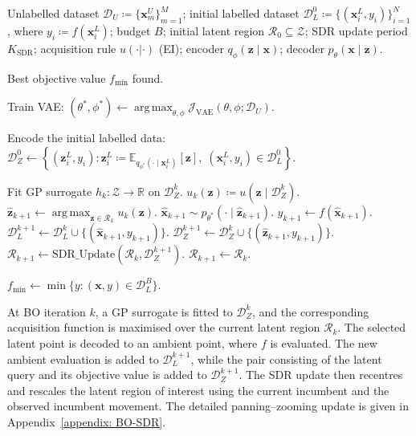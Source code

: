 \documentclass[pdflatex,sn-mathphys-num]{sn-jnl}%
\theoremstyle{thmstyleone}%
\theoremstyle{thmstyletwo}%
\theoremstyle{thmstylethree}%
\begin{document}
\begin{algorithm}[h]
\caption{BO--VAE with SDR and a Fixed Pretrained VAE}
\label{BOVAE-SDR}
\begin{algorithmic}[1]
\small
\Require Unlabelled dataset $\mathcal D_U \coloneq \{\mathbf{x}_m^U\}_{m=1}^M$; initial labelled dataset $\mathcal D_L^0 \coloneq \{(\mathbf{x}_i^L,y_i)\}_{i=1}^N$, where $y_i \coloneq f(\mathbf{x}_i^L)$; budget $B$; initial latent region $\mathcal R_0\subseteq\mathcal Z$; SDR update period $K_{\mathrm{SDR}}$; acquisition rule $u(\cdot|\cdot)$ \textrm{(EI)}; encoder $q_\phi(\mathbf z\mid\mathbf x)$; decoder $p_\theta(\mathbf x\mid\mathbf z)$.

\Ensure Best objective value $f_{\min}$ found.

\State Train VAE: $(\theta^\ast,\phi^\ast) \leftarrow \operatorname*{arg\,max}_{\theta,\phi} \mathcal J_{\mathrm{VAE}}(\theta,\phi;\mathcal D_U)$.

\State Encode the initial labelled data: $\mathcal D_Z^0 \leftarrow \left\{(\mathbf z_i^L,y_i): \mathbf z_i^L \coloneq \mathbb E_{q_{\phi^\ast}(\cdot\mid\mathbf x_i^L)}[\mathbf z], \;(\mathbf x_i^L,y_i)\in\mathcal D_L^0 \right\}$.

    \State Fit GP surrogate $h_k:\mathcal Z\to\mathbb R$ on $\mathcal D_Z^k$.
    \State $u_k(\mathbf z)\coloneq u(\mathbf z\mid\mathcal D_Z^k)$. 
    \State $\hat{\mathbf z}_{k+1} \leftarrow \operatorname*{arg\,max}_{\mathbf z\in\mathcal R_k} u_k(\mathbf z)$.
    \State $\hat{\mathbf x}_{k+1} \sim p_{\theta^\ast}(\cdot\mid\hat{\mathbf z}_{k+1})$. 
    \State $y_{k+1}\leftarrow f(\hat{\mathbf x}_{k+1})$. 
    \State $\mathcal D_L^{k+1} \leftarrow \mathcal D_L^k \cup \{(\hat{\mathbf x}_{k+1},y_{k+1})\}$. 
    \State $\mathcal D_Z^{k+1} \leftarrow \mathcal D_Z^k \cup \{(\hat{\mathbf z}_{k+1},y_{k+1})\}$. 
     
        \State $\mathcal R_{k+1} \leftarrow \mathrm{SDR\_Update}(\mathcal R_k,\mathcal D_Z^{k+1})$.
    \Else
        \State $\mathcal R_{k+1}\leftarrow \mathcal R_k$.
    \EndIf
\EndFor

\State \Return $f_{\min} \leftarrow \min\{y:(\mathbf x,y)\in\mathcal D_L^B\}$.
\end{algorithmic}
\end{algorithm}
\FloatBarrier
\normalsize
At BO iteration \(k\), a GP surrogate is fitted to \(\mathcal D_Z^k\), and the corresponding acquisition function is maximised over the current latent region \(\mathcal R_k\). The selected latent point is decoded to an ambient point, where \(f\) is evaluated. The new ambient evaluation is added to \(\mathcal D_L^{k+1}\), while the pair consisting of the latent query and its objective value is added to \(\mathcal D_Z^{k+1}\). The SDR update then recentres and rescales the latent region of interest using the current incumbent and the observed incumbent movement. The detailed panning--zooming update is given in Appendix~\ref{appendix: BO-SDR}.
\end{document}
